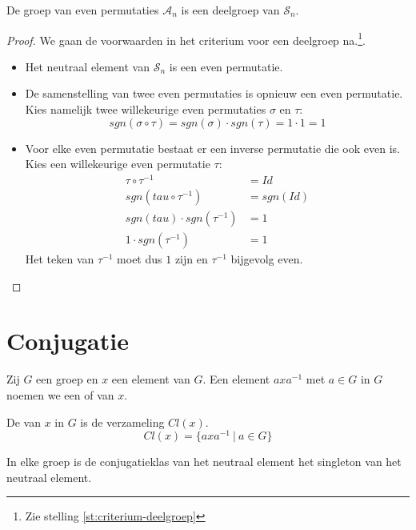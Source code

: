 \documentclass[main.tex]{subfiles}
\begin{document}
\begin{pr}
  De groep van even permutaties $\mathcal{A}_{n}$ is een deelgroep van $\mathcal{S}_{n}$.
  \begin{proof}
    We gaan de voorwaarden in het criterium voor een deelgroep na.\footnote{Zie stelling \ref{st:criterium-deelgroep}}.
    \begin{itemize}
    \item Het neutraal element van $\mathcal{S}_{n}$ is een even permutatie.
    \item De samenstelling van twee even permutaties is opnieuw een even permutatie.
      Kies namelijk twee willekeurige even permutaties $\sigma$ en $\tau$:
      \[ sgn(\sigma \circ \tau) = sgn(\sigma) \cdot sgn(\tau) = 1 \cdot 1 = 1 \]
    \item Voor elke even permutatie bestaat er een inverse permutatie die ook even is.
      Kies een willekeurige even permutatie $\tau$:
      \[
      \begin{array}{rl}
        \tau \circ \tau^{-1} &= Id\\
        sgn(tau \circ \tau^{-1}) &= sgn(Id)\\
        sgn(tau) \cdot sgn(\tau^{-1}) &= 1\\
        1 \cdot sgn(\tau^{-1}) &= 1
      \end{array}
      \]
      Het teken van $\tau^{-1}$ moet dus $1$ zijn en $\tau^{-1}$ bijgevolg even.
    \end{itemize}
  \end{proof}
\end{pr}

\section{Conjugatie}
\label{sec:conjugatie}

\begin{de}
  Zij $G$ een groep en $x$ een element van $G$.
  Een element $axa^{-1}$ met $a\in G$ in $G$ noemen we een  of  van $x$.
\end{de}

\begin{de}
  De  van $x$ in $G$ is de verzameling $Cl(x)$.
  \[ Cl(x) = \{ axa^{-1}\ |\ a \in G \} \]
\end{de}

\begin{st}
  In elke groep is de conjugatieklas van het neutraal element het singleton van het neutraal element.
\end{st}
\end{document}
